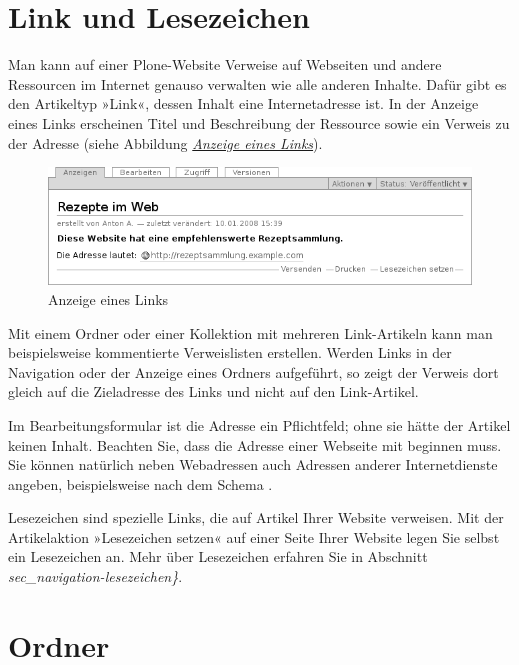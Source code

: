 \documentclass[a4paper,12pt,ngerman]{manual}
\begin{document}
\resetcurrentobjects
\hypertarget{--doc-inhaltstypen/link}{}

\hypertarget{sec-link}{}\section{Link und Lesezeichen}

Man kann auf einer Plone-Website Verweise auf Webseiten und andere Ressourcen
im Internet genauso verwalten wie alle anderen Inhalte. Dafür gibt es
den Artikeltyp »Link«, dessen Inhalt eine Internetadresse ist. In der
Anzeige eines Links erscheinen Titel und Beschreibung der Ressource sowie ein
Verweis zu der Adresse (siehe Abbildung \hyperlink{fig-link}{\emph{Anzeige eines Links}}).
\hypertarget{fig-link}{}\begin{figure}[htbp]
\centering

\includegraphics{link.png}
\caption{Anzeige eines Links}\end{figure}

Mit einem Ordner oder einer Kollektion mit mehreren Link-Artikeln kann man
beispielsweise kommentierte Verweislisten erstellen. Werden Links in der
Navigation oder der Anzeige eines Ordners aufgeführt, so zeigt der Verweis
dort gleich auf die Zieladresse des Links und nicht auf den Link-Artikel.

Im Bearbeitungsformular ist die Adresse ein Pflichtfeld; ohne sie hätte
der Artikel keinen Inhalt. Beachten Sie, dass die Adresse einer Webseite mit
 beginnen muss. Sie können natürlich neben Webadressen auch
Adressen anderer Internetdienste angeben, beispielsweise nach dem Schema
.

Lesezeichen sind spezielle Links, die auf Artikel Ihrer Website verweisen. Mit
der Artikelaktion »Lesezeichen setzen« auf einer Seite Ihrer Website legen Sie
selbst ein Lesezeichen an. Mehr über Lesezeichen erfahren Sie in
Abschnitt \emph{sec\_navigation-lesezeichen\}}.

\resetcurrentobjects
\hypertarget{--doc-inhaltstypen/ordner}{}

\hypertarget{sec-ordner}{}\section{Ordner}
\end{document}
